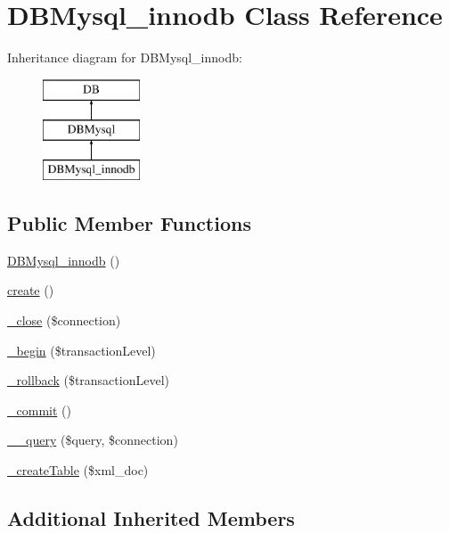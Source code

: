 \hypertarget{classDBMysql__innodb}{\section{D\+B\+Mysql\+\_\+innodb Class Reference}
\label{classDBMysql__innodb}
}
Inheritance diagram for D\+B\+Mysql\+\_\+innodb\+:\begin{figure}[H]
\begin{center}
\leavevmode
\includegraphics[height=3.000000cm]{classDBMysql__innodb}
\end{center}
\end{figure}
\subsection*{Public Member Functions}
\begin{DoxyCompactItemize}
\item 
\hyperlink{classDBMysql__innodb_ad56600e5cbe42a0b26f40c2fd34dd4ea}{D\+B\+Mysql\+\_\+innodb} ()
\item 
\hyperlink{classDBMysql__innodb_ac00d0e52855fb50fc453dd78367de102}{create} ()
\item 
\hyperlink{classDBMysql__innodb_a006f982aef8b7fd2909d3912e0afb032}{\+\_\+close} (\$connection)
\item 
\hyperlink{classDBMysql__innodb_a1554d09da5f13e46a812d0ecf7e2efcc}{\+\_\+begin} (\$transaction\+Level)
\item 
\hyperlink{classDBMysql__innodb_af9c5a29501a0748f0b17a6a532008226}{\+\_\+rollback} (\$transaction\+Level)
\item 
\hyperlink{classDBMysql__innodb_a9ffbd5a0d262ae7dd7fb840822a7e543}{\+\_\+commit} ()
\item 
\hyperlink{classDBMysql__innodb_a12af9ec87d5f630d282c2bc2571ee5fe}{\+\_\+\+\_\+query} (\$query, \$connection)
\item 
\hyperlink{classDBMysql__innodb_aa2b634992fbfaaadea5c897b8810b87c}{\+\_\+create\+Table} (\$xml\+\_\+doc)
\end{DoxyCompactItemize}
\subsection*{Additional Inherited Members}


